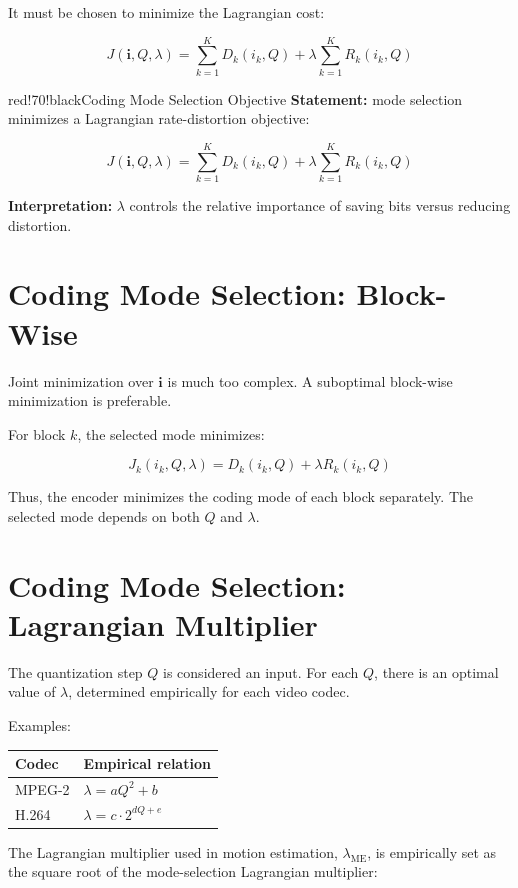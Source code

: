 It must be chosen to minimize the Lagrangian cost:

\[
J(\mathbf{i}, Q, \lambda) =
\sum_{k=1}^{K} D_k(i_k, Q)
+ \lambda \sum_{k=1}^{K} R_k(i_k, Q)
\]

\begin{calloutbox}{red!70!black}{Coding Mode Selection Objective}
\textbf{Statement:} mode selection minimizes a Lagrangian rate-distortion objective:

\[
J(\mathbf{i}, Q, \lambda) =
\sum_{k=1}^{K} D_k(i_k, Q)
+ \lambda \sum_{k=1}^{K} R_k(i_k, Q)
\]

\textbf{Interpretation:} $\lambda$ controls the relative importance of saving bits versus reducing distortion.
\end{calloutbox}

\section{Coding Mode Selection: Block-Wise}

Joint minimization over $\mathbf{i}$ is much too complex. A suboptimal block-wise minimization is preferable.

For block $k$, the selected mode minimizes:

\[
J_k(i_k, Q, \lambda) =
D_k(i_k, Q) + \lambda R_k(i_k, Q)
\]

Thus, the encoder minimizes the coding mode of each block separately. The selected mode depends on both $Q$ and $\lambda$.

\section{Coding Mode Selection: Lagrangian Multiplier}

The quantization step $Q$ is considered an input. For each $Q$, there is an optimal value of $\lambda$, determined empirically for each video codec.

Examples:

\begin{center}
\begin{tabular}{|l|l|}
\hline
\textbf{Codec} & \textbf{Empirical relation} \\ \hline
MPEG-2 & $\lambda = aQ^2 + b$ \\ \hline
H.264 & $\lambda = c \cdot 2^{dQ+e}$ \\ \hline
\end{tabular}
\end{center}

The Lagrangian multiplier used in motion estimation, $\lambda_{\text{ME}}$, is empirically set as the square root of the mode-selection Lagrangian multiplier:

